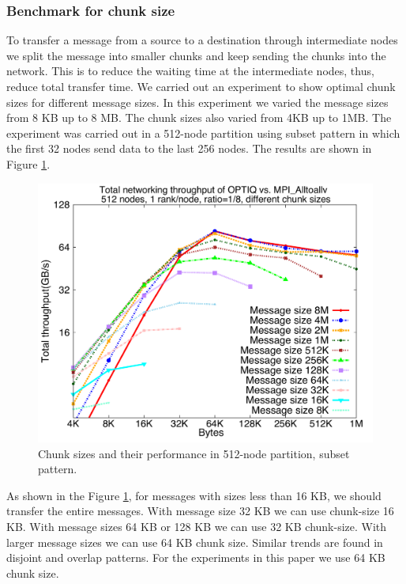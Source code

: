 \subsubsection{Benchmark for chunk size}

To transfer a message from a source to a destination through intermediate nodes we split the message into smaller chunks and keep sending the chunks into the network. This is to reduce the waiting time at the intermediate nodes, thus, reduce total transfer time. We carried out an experiment to show optimal chunk sizes for different message sizes. In this experiment we varied the message sizes from 8 KB up to 8 MB. The chunk sizes also varied from 4KB up to 1MB. The experiment was carried out in a 512-node partition using subset pattern in which the first 32 nodes send data to the last 256 nodes. The results are shown in Figure \ref{fig:chunksize}.

\begin{figure}[!htb]
\vspace{-0.1in}
\centering
\includegraphics[scale=0.30]{figures/87_chunksize.pdf}
\vspace{-0.1in}
\caption{Chunk sizes and their performance in 512-node partition, subset pattern.}
\vspace{-0.1in}
\label{fig:chunksize}
\end{figure}

As shown in the Figure \ref{fig:chunksize}, for messages with sizes less than 16 KB, we should transfer the entire messages. With message size 32 KB we can use chunk-size 16 KB. With message sizes 64 KB or 128 KB we can use 32 KB chunk-size. With larger message sizes we can use 64 KB chunk size. Similar trends are found in disjoint and overlap patterns. For the experiments in this paper we use 64 KB chunk size.
